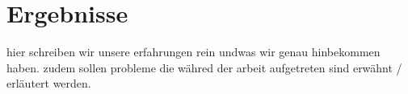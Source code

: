 \chapter{Ergebnisse}
\begin{Spacing}{\mylinespace}

hier schreiben wir unsere erfahrungen rein undwas wir genau hinbekommen haben. zudem sollen probleme die währed der arbeit aufgetreten sind erwähnt / erläutert werden. \\

\end{Spacing}
\newpage
\clearpage
